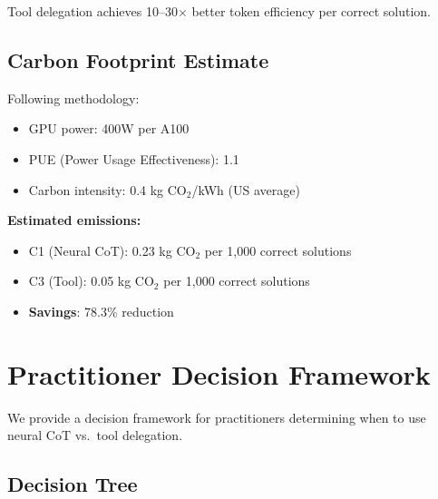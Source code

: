 \documentclass{article}
\theoremstyle{plain}
\theoremstyle{definition}
\theoremstyle{remark}
\begin{document}
Tool delegation achieves 10--30$\times$ better token efficiency per correct solution.

\subsection{Carbon Footprint Estimate}

Following \citet{strubell2019energy} methodology:

\begin{itemize}
\item GPU power: 400W per A100
\item PUE (Power Usage Effectiveness): 1.1
\item Carbon intensity: 0.4 kg CO$_2$/kWh (US average)
\end{itemize}

\textbf{Estimated emissions:}
\begin{itemize}
\item C1 (Neural CoT): 0.23 kg CO$_2$ per 1,000 correct solutions
\item C3 (Tool): 0.05 kg CO$_2$ per 1,000 correct solutions
\item \textbf{Savings}: 78.3\% reduction
\end{itemize}


\section{Practitioner Decision Framework}
\label{app:framework}

We provide a decision framework for practitioners determining when to use neural CoT vs.\ tool delegation.

\subsection{Decision Tree}
\end{document}

